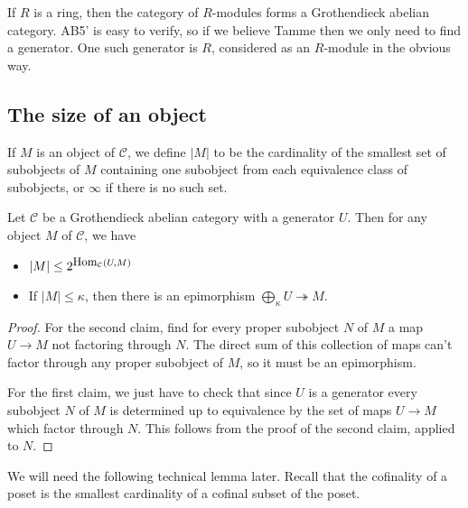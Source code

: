 \begin{ex} If $R$ is a ring, then the category of $R$-modules forms a Grothendieck abelian category. AB5' is easy to verify, so if we believe Tamme then we only need to find a generator. One such generator is $R$, considered as an $R$-module in the obvious way.
\end{ex}

\subsection{The size of an object}
\begin{defn} If $M$ is an object of $\mathcal{C}$, we define $|M|$ to be the cardinality of the smallest set of subobjects of $M$ containing one subobject from each equivalence class of subobjects, or $\infty$ if there is no such set.
\end{defn}

\begin{prop} Let $\mathcal{C}$ be a Grothendieck abelian category with a generator $U$. Then for any object $M$ of $\mathcal{C}$, we have
\begin{itemize}
\item $|M| \le 2^{\mbox{\rm \small Hom}_{\mathcal{C}}(U,M)}$

\item If $|M| \le \kappa$, then there is an epimorphism $\bigoplus_\kappa U \twoheadrightarrow M$.
\end{itemize}
\end{prop}
\begin{proof} For the second claim, find for every proper subobject $N$ of $M$ a map $U\rightarrow M$ not factoring through $N$. The direct sum of this collection of maps can't factor through any proper subobject of $M$, so it must be an epimorphism.

For the first claim, we just have to check that since $U$ is a generator every subobject $N$ of $M$ is determined up to equivalence by the set of maps $U\rightarrow M$ which factor through $N$. This follows from the proof of the second claim, applied to $N$.
\end{proof}

We will need the following technical lemma later. Recall that the cofinality of a poset is the smallest cardinality of a cofinal subset of the poset.

